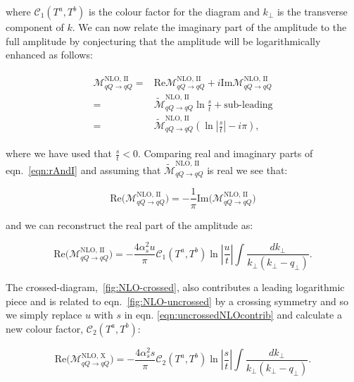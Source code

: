		where $\mathcal{C}_1(T^a,T^b)$ is the colour factor for the diagram and $k_{\perp}$ is the transverse
		component of $k$.  We can now relate the imaginary part of the amplitude to the full amplitude by
		conjecturing that the amplitude will be logarithmically enhanced as follows:

		\begin{align}
		\begin{split}
			\mathcal{M}_{qQ\rightarrow qQ}^{\text{NLO, II}} = &\text{Re}\mathcal{M}_{qQ\rightarrow qQ}^{\text{NLO, II}} +
			i\text{Im}\mathcal{M}_{qQ\rightarrow qQ}^{\text{NLO, II}}\\
			=&\widetilde{\mathcal{M}}_{qQ\rightarrow qQ}^{\text{NLO, II}}\ln\frac{s}{t} + \text{sub-leading}\\
			=&\widetilde{\mathcal{M}}_{qQ\rightarrow qQ}^{\text{NLO, II}}\left(\ln\left|\frac{s}{t}\right| -i\pi\right),
			\label{eqn:rAndI}
		\end{split}
		\end{align}

		where we have used that $\frac{s}{t} < 0$.  Comparing real and imaginary parts of eqn.~\eqref{eqn:rAndI} and assuming
		that $\widetilde{\mathcal{M}}_{qQ\rightarrow qQ}^{\text{NLO, II}}$ is real we see that:

		\begin{equation}
			\text{Re}\Big(\mathcal{M}_{qQ\rightarrow qQ}^{\text{NLO, II}}\Big) = -\frac{1}{\pi}\text{Im}\Big(\mathcal{M}_{qQ\rightarrow qQ}^{\text{NLO, II}}\Big)
		\end{equation}

		and we can reconstruct the real part of the amplitude as:

		\begin{equation}
			\text{Re}\Big(\mathcal{M}_{qQ\rightarrow qQ}^{\text{NLO, II}}\Big) = -\frac{4\alpha_s^2u}{\pi} \mathcal{C}_1(T^a,T^b)
			\ln\left|\frac{u}{t}\right|\int \frac{dk_{\perp}}{k_{\perp}(k_{\perp} - q_{\perp})}.
			\label{eqn:uncrossedNLOcontrib}
		\end{equation}

		The crossed-diagram,~\eqref{fig:NLO-crossed}, also contributes a leading logarithmic piece and is related to
		eqn.~\eqref{fig:NLO-uncrossed} by a crossing symmetry and so we simply replace $u$ with $s$ in eqn.
		\eqref{eqn:uncrossedNLOcontrib} and calculate a new colour factor, $\mathcal{C}_2(T^a,T^b)$:

		\begin{equation}
			\text{Re}\Big(\mathcal{M}_{qQ\rightarrow qQ}^{\text{NLO, X}}\Big) = -\frac{4\alpha_s^2s}{\pi} \mathcal{C}_2(T^a,T^b)
			\ln\left|\frac{s}{t}\right| \int \frac{dk_{\perp}}{k_{\perp}(k_{\perp} - q_{\perp})}.
			\label{eqn:crossedNLOcontrib}
		\end{equation}

